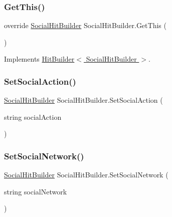 \mbox{\label{class_social_hit_builder_a6c7d040e21d2c01a4d532ca4bd7d1221}} 
\subsubsection{\texorpdfstring{Get\+This()}{GetThis()}}
{\footnotesize\ttfamily override \hyperlink{class_social_hit_builder}{Social\+Hit\+Builder} Social\+Hit\+Builder.\+Get\+This (\begin{DoxyParamCaption}{ }\end{DoxyParamCaption})\hspace{0.3cm}{\ttfamily [virtual]}}



Implements \hyperlink{class_hit_builder_a4276c57427406e264dc33f8c900ad530}{Hit\+Builder$<$ Social\+Hit\+Builder $>$}.

\mbox{\label{class_social_hit_builder_ad19afce200693cf8279690ed1863b018}} 
\subsubsection{\texorpdfstring{Set\+Social\+Action()}{SetSocialAction()}}
{\footnotesize\ttfamily \hyperlink{class_social_hit_builder}{Social\+Hit\+Builder} Social\+Hit\+Builder.\+Set\+Social\+Action (\begin{DoxyParamCaption}\item[{string}]{social\+Action }\end{DoxyParamCaption})}

\mbox{\label{class_social_hit_builder_a6e435c63ac9461d06d0548b4035719b9}} 
\subsubsection{\texorpdfstring{Set\+Social\+Network()}{SetSocialNetwork()}}
{\footnotesize\ttfamily \hyperlink{class_social_hit_builder}{Social\+Hit\+Builder} Social\+Hit\+Builder.\+Set\+Social\+Network (\begin{DoxyParamCaption}\item[{string}]{social\+Network }\end{DoxyParamCaption})}

